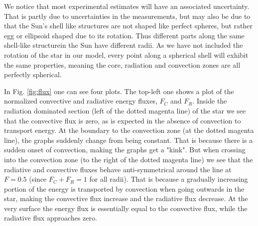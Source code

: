 \documentclass{emulateapj}
\begin{document}
	We notice that most experimental estimates will have an associated uncertainty. That is partly due to uncertainties in the measurements, but may also be due to that the Sun's shell like structures are not shaped like perfect spheres, but rather egg or ellipsoid shaped due to its rotation. Thus different parts along the same shell-like structurein the Sun have different radii. As we have not included the rotation of the star in our model, every point along a spherical shell will exhibit the same properties, meaning the core, radiation and convection zones are all perfectly spherical. 
	
	In Fig. \ref{fig:flux} one can see four plots. The top-left one shows a plot of the normalized convective and radiative energy fluxes, $F_C$ and $F_R$. Inside the radiation dominated section (left of the dotted magenta line) of the star we see that the convective flux is zero, as is expected in the absence of convection to transport energy. At the boundary to the convection zone (at the dotted magenta line), the graphs suddenly change from being constant. That is because there is a sudden onset of convection, making the graphs get a "kink". But when crossing into the convection zone (to the right of the dotted magenta line) we see that the radiative and convective fluxes behave anti-symmetrical around the line at $F=0.5$ (since $F_C+F_R = 1$ for all radii). That is because a gradually increasing portion of the energy is transported by convection when going outwards in the star, making the convective flux increase and the radiative flux decrease. At the very surface the energy flux is essentially equal to the convective flux, while the radiative flux approaches zero.
	
\end{document}
